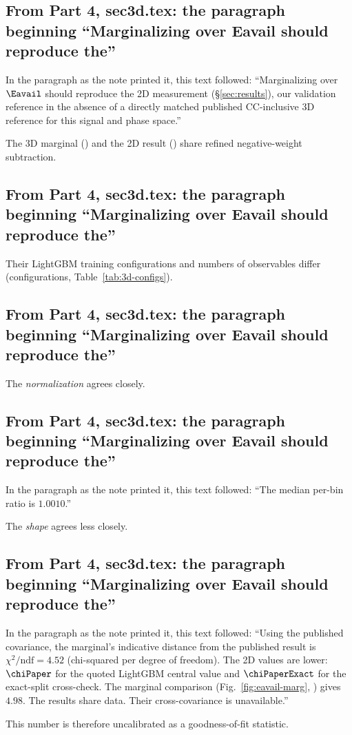 \subsection{From Part 4, sec3d.tex: the paragraph beginning ``Marginalizing over Eavail should reproduce the''}
In the paragraph as the note printed it, this text followed: ``Marginalizing over $\Eavail$ should reproduce the 2D measurement (\S\ref{sec:results}), our validation reference in the absence of a directly matched published CC-inclusive 3D reference for this signal and phase space.''\par
The 3D marginal (\estMultiD{}) and the 2D result (\estTwoD{}) share refined negative-weight subtraction.

\subsection{From Part 4, sec3d.tex: the paragraph beginning ``Marginalizing over Eavail should reproduce the''}
Their LightGBM training configurations and numbers of observables differ (configurations, Table~\ref{tab:3d-configs}).

\subsection{From Part 4, sec3d.tex: the paragraph beginning ``Marginalizing over Eavail should reproduce the''}
The \emph{normalization} agrees closely.

\subsection{From Part 4, sec3d.tex: the paragraph beginning ``Marginalizing over Eavail should reproduce the''}
In the paragraph as the note printed it, this text followed: ``The median per-bin ratio is $1.0010$.''\par
The \emph{shape} agrees less closely.

\subsection{From Part 4, sec3d.tex: the paragraph beginning ``Marginalizing over Eavail should reproduce the''}
In the paragraph as the note printed it, this text followed: ``Using the published covariance, the marginal's indicative distance from the published result is $\chi^{2}/\mathrm{ndf}=4.52$ (chi-squared per degree of freedom). The 2D values are lower: $\chiPaper$ for the quoted LightGBM central value and $\chiPaperExact$ for the exact-split cross-check. The marginal comparison (Fig.~\ref{fig:eavail-marg}, \estPurity{}) gives $4.98$. The results share data. Their cross-covariance is unavailable.''\par
This number is therefore uncalibrated as a goodness-of-fit statistic.

